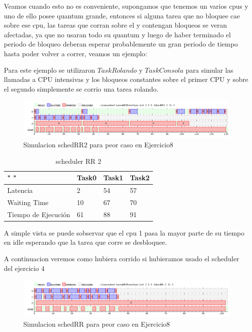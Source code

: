 \documentclass[11pt]{article}
\begin{document}
Veamos cuando esto no es conveniente, supongamos que tenemos un varios cpus y uno de ello posee quantum grande, entonces si alguna tarea que no bloquee cae sobre ese cpu, las tareas que corran sobre el y contengan bloqueos se veran afectadas, ya que no usaran todo su quantum y luego de haber terminado el periodo de bloqueo deberan esperar probablemente un gran periodo de tiempo hasta poder volver a correr, veamos un ejemplo: 

Para este ejemplo se utilizaron $TaskRolando$ y $TaskConsola$ para simular las llamadas a CPU intensivas y los bloqueos constantes sobre el primer CPU y sobre el segundo simplemente se corrio una tarea rolando.

  \begin{figure}[H]
    \includegraphics[scale=0.5]{Ej8PeorCaso}
    \caption{Simulacion schedRR2 para peor caso en Ejercicio8}
  \end{figure}

  \begin{table}[htb]
  \centering
  \begin{tabular}{| l | l | l | l |}
  \hline
  " " & Task0 & Task1 & Task2 \\
  \hline \hline
  Latencia & 2 & 54 & 57 \\ \hline
  Waiting Time & 10 & 67 & 70 \\ \hline
  Tiempo de Ejecución & 61 & 88 & 91 \\ \hline
  \end{tabular}
  \caption{scheduler RR 2}
  \end{table}

A simple vista se puede sobservar que el cpu 1 pasa la mayor parte de su tiempo en idle esperando que la tarea que corre se desbloquee. 

A continuacion veremos como hubiera corrido si hubieramos usado el scheduler del ejercicio 4

  \begin{figure}[H]
    \includegraphics[scale=0.5]{Ej8PeorCasoRR}
    \caption{Simulacion schedRR para peor caso en Ejercicio8}
  \end{figure}
\end{document}
